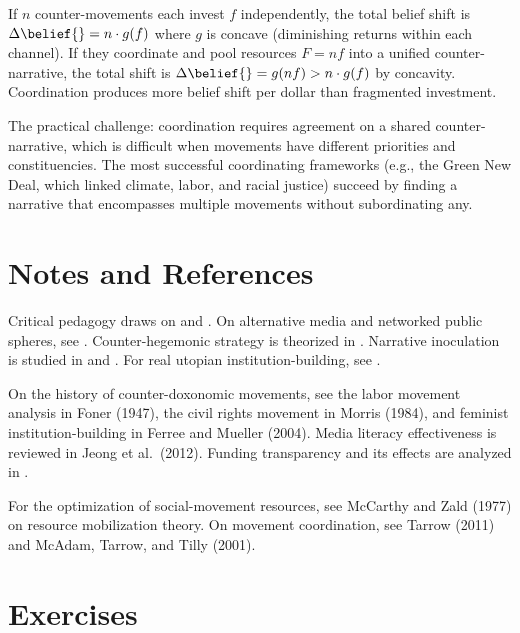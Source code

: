 \begin{proposition}
\label{prop:coordination}
If $n$ counter-movements each invest $f$ independently, the total belief shift is $\Delta\belief{} = n \cdot g(f)$ where $g$ is concave (diminishing returns within each channel).
If they coordinate and pool resources $F = nf$ into a unified counter-narrative, the total shift is $\Delta\belief{} = g(nf) > n \cdot g(f)$ by concavity.
Coordination produces more belief shift per dollar than fragmented investment.
\end{proposition}

The practical challenge: coordination requires agreement on a shared counter-narrative, which is difficult when movements have different priorities and constituencies.
The most successful coordinating frameworks (e.g., the Green New Deal, which linked climate, labor, and racial justice) succeed by finding a narrative that encompasses multiple movements without subordinating any.

\section{Notes and References}
\label{sec:ch31-notes}

Critical pedagogy draws on \textcite{freire1968} and \textcite{illich1971}.
On alternative media and networked public spheres, see \textcite{benkler2006}.
Counter-hegemonic strategy is theorized in \textcite{gramsci1971}.
Narrative inoculation is studied in \textcite{mcguire1964} and \textcite{vanderlinden2022}.
For real utopian institution-building, see \textcite{wright2010}.

On the history of counter-doxonomic movements, see the labor movement analysis in Foner (1947), the civil rights movement in Morris (1984), and feminist institution-building in Ferree and Mueller (2004).
Media literacy effectiveness is reviewed in Jeong et al.\ (2012).
Funding transparency and its effects are analyzed in \textcite{mayer2016}.

For the optimization of social-movement resources, see McCarthy and Zald (1977) on resource mobilization theory.
On movement coordination, see Tarrow (2011) and McAdam, Tarrow, and Tilly (2001).

\section{Exercises}


